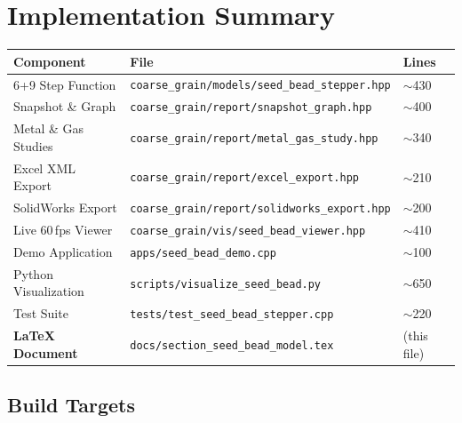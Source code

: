 \documentclass[11pt, a4paper, oneside]{article}
\newcommand{\file}[1]{\texttt{#1}}
\begin{document}
\newpage
\section{Implementation Summary}
\label{sec:implementation}

\begin{center}
\begin{tabular}{lll}
  \toprule
  \textbf{Component} & \textbf{File} & \textbf{Lines} \\
  \midrule
  6+9 Step Function       & \file{coarse\_grain/models/seed\_bead\_stepper.hpp} & $\sim$430 \\
  Snapshot \& Graph       & \file{coarse\_grain/report/snapshot\_graph.hpp}     & $\sim$400 \\
  Metal \& Gas Studies    & \file{coarse\_grain/report/metal\_gas\_study.hpp}   & $\sim$340 \\
  Excel XML Export        & \file{coarse\_grain/report/excel\_export.hpp}       & $\sim$210 \\
  SolidWorks Export       & \file{coarse\_grain/report/solidworks\_export.hpp}  & $\sim$200 \\
  Live 60\,fps Viewer     & \file{coarse\_grain/vis/seed\_bead\_viewer.hpp}     & $\sim$410 \\
  Demo Application        & \file{apps/seed\_bead\_demo.cpp}                    & $\sim$100 \\
  Python Visualization    & \file{scripts/visualize\_seed\_bead.py}             & $\sim$650 \\
  Test Suite              & \file{tests/test\_seed\_bead\_stepper.cpp}          & $\sim$220 \\
  \midrule
  \textbf{LaTeX Document} & \file{docs/section\_seed\_bead\_model.tex}          & (this file) \\
  \bottomrule
\end{tabular}
\end{center}

\subsection{Build Targets}
\label{sec:build-targets}
\end{document}
